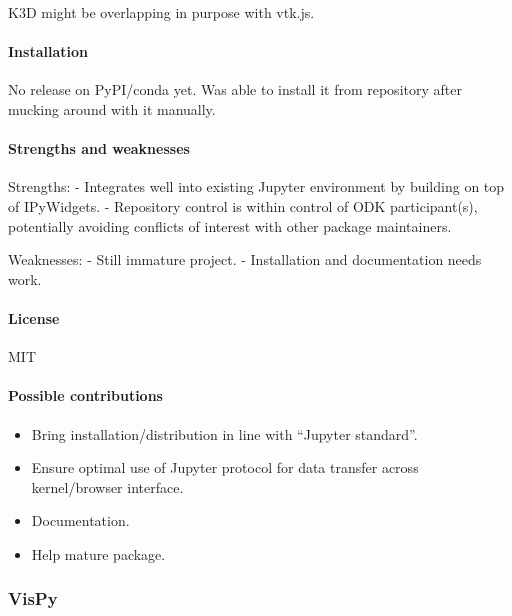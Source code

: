 K3D might be overlapping in purpose with vtk.js.

\hypertarget{installation}{%
\paragraph{Installation}\label{installation}}

No release on PyPI/conda yet. Was able to install it from repository
after mucking around with it manually.

\hypertarget{strengths-and-weaknesses}{%
\paragraph{Strengths and
weaknesses}\label{strengths-and-weaknesses}}

Strengths: - Integrates well into existing Jupyter environment by
building on top of IPyWidgets. - Repository control is within control of
ODK participant(s), potentially avoiding conflicts of interest with
other package maintainers.

Weaknesses: - Still immature project. - Installation and documentation
needs work.

\hypertarget{license}{%
\paragraph{License}\label{license}}

MIT

\hypertarget{possible-contributions}{%
\paragraph{Possible contributions}\label{possible-contributions}}

\begin{itemize}
\tightlist
\item
  Bring installation/distribution in line with ``Jupyter standard''.
\item
  Ensure optimal use of Jupyter protocol for data transfer across
  kernel/browser interface.
\item
  Documentation.
\item
  Help mature package.
\end{itemize}

    \hypertarget{vispy}{%
\subsubsection{VisPy}\label{vispy}}

